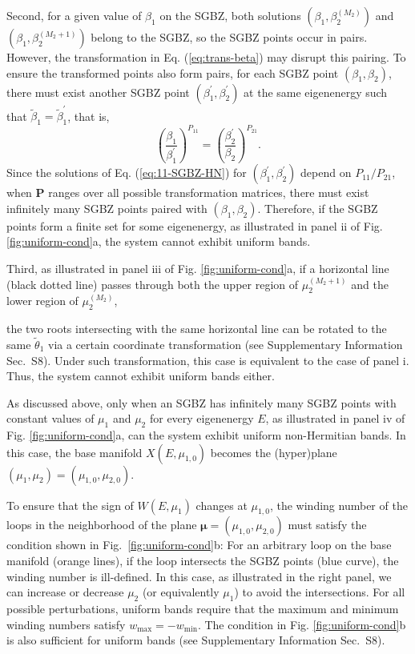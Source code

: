 Second, for a given value of $\beta_{1}$ on the SGBZ, both solutions
$(\beta_{1},\beta_{2}^{(M_{2})})$ and $(\beta_{1},\beta_{2}^{(M_{2}+1)})$
belong to the SGBZ, so the SGBZ points occur in pairs. However, the
transformation in Eq. (\ref{eq:trans-beta}) may disrupt this pairing.
To ensure the transformed points also form pairs, for each SGBZ point
$(\beta_{1},\beta_{2})$, there must exist another SGBZ point $(\beta_{1}^{\prime},\beta_{2}^{\prime})$
at the same eigenenergy such that $\tilde{\beta}_{1}=\tilde{\beta}_{1}^{\prime}$,
that is, 
\begin{equation}
\left(\frac{\beta_{1}}{\beta_{1}^{\prime}}\right)^{P_{11}}=\left(\frac{\beta_{2}^{\prime}}{\beta_{2}}\right)^{P_{21}}.\label{eq:beta-pairing}
\end{equation}
Since the solutions of Eq. (\ref{eq:11-SGBZ-HN}) for $(\beta_{1}^{\prime},\beta_{2}^{\prime})$
depend on $P_{11}/P_{21}$, when $\mathbf{P}$ ranges over all possible
transformation matrices, there must exist infinitely many SGBZ points
paired with $(\beta_{1},\beta_{2})$. Therefore, if the SGBZ points
form a finite set for some eigenenergy, as illustrated in panel ii
of Fig. \ref{fig:uniform-cond}a, the system cannot exhibit uniform
bands.

Third, as illustrated in panel iii of Fig. \ref{fig:uniform-cond}a,
if a horizontal line (black dotted line) passes through both the upper
region of $\mu_{2}^{(M_{2}+1)}$ and the lower region of $\mu_{2}^{(M_{2})}$,

the two roots intersecting with the same horizontal line can be rotated to the same $\tilde{\theta}_1$ via a certain coordinate transformation (see Supplementary Information Sec.~S8). Under such transformation, this case is equivalent to the case of panel i. Thus, the system cannot exhibit uniform bands either.


As discussed above, only when an SGBZ has infinitely many SGBZ points
with constant values of $\mu_{1}$ and $\mu_{2}$ for every eigenenergy
$E$, as illustrated in panel iv of Fig. \ref{fig:uniform-cond}a,
can the system exhibit uniform non-Hermitian bands. In this case,
the base manifold $X(E,\mu_{1,0})$ becomes the (hyper)plane $(\mu_{1},\mu_{2})=(\mu_{1,0},\mu_{2,0})$.
 
To ensure that the sign of $W(E,\mu_1)$ changes at $\mu_{1,0}$, the winding number of the loops in the neighborhood of the plane $\boldsymbol{\mu} = (\mu_{1,0},\mu_{2,0})$ must satisfy the condition shown in Fig.~\ref{fig:uniform-cond}b:
For an arbitrary loop on
the base manifold (orange lines), if the loop intersects the SGBZ
points (blue curve), the winding number is ill-defined. In this case,
as illustrated in the right panel, we can increase or decrease $\mu_{2}$
(or equivalently $\mu_{1}$) to avoid the intersections. For all possible
perturbations, uniform bands require that the maximum and minimum
winding numbers satisfy $w_{\text{max}}=-w_{\text{min}}$. The condition
in Fig. \ref{fig:uniform-cond}b is also sufficient for uniform bands (see Supplementary Information Sec.~S8).


